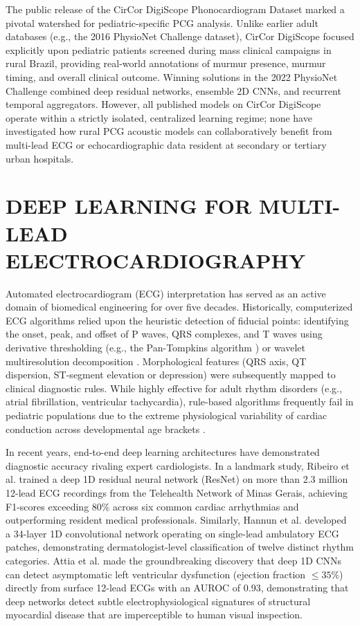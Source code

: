 \documentclass[12pt,a4paper]{amritareport}
\begin{document}
The public release of the CirCor DigiScope Phonocardiogram Dataset \cite{oliveira2022circor} marked a pivotal watershed for pediatric-specific PCG analysis. Unlike earlier adult databases (e.g., the 2016 PhysioNet Challenge dataset), CirCor DigiScope focused explicitly upon pediatric patients screened during mass clinical campaigns in rural Brazil, providing real-world annotations of murmur presence, murmur timing, and overall clinical outcome. Winning solutions in the 2022 PhysioNet Challenge \cite{reyna2022heart} combined deep residual networks, ensemble 2D CNNs, and recurrent temporal aggregators. However, all published models on CirCor DigiScope operate within a strictly isolated, centralized learning regime; none have investigated how rural PCG acoustic models can collaboratively benefit from multi-lead ECG or echocardiographic data resident at secondary or tertiary urban hospitals.


\section{DEEP LEARNING FOR MULTI-LEAD ELECTROCARDIOGRAPHY}

Automated electrocardiogram (ECG) interpretation has served as an active domain of biomedical engineering for over five decades. Historically, computerized ECG algorithms relied upon the heuristic detection of fiducial points: identifying the onset, peak, and offset of P waves, QRS complexes, and T waves using derivative thresholding (e.g., the Pan-Tompkins algorithm \cite{pan1985real}) or wavelet multiresolution decomposition \cite{martinez2004wavelet}. Morphological features (QRS axis, QT dispersion, ST-segment elevation or depression) were subsequently mapped to clinical diagnostic rules. While highly effective for adult rhythm disorders (e.g., atrial fibrillation, ventricular tachycardia), rule-based algorithms frequently fail in pediatric populations due to the extreme physiological variability of cardiac conduction across developmental age brackets \cite{dicapua2019pediatric}.

In recent years, end-to-end deep learning architectures have demonstrated diagnostic accuracy rivaling expert cardiologists. In a landmark study, Ribeiro et al. \cite{ribeiro2020automatic} trained a deep 1D residual neural network (ResNet) on more than 2.3 million 12-lead ECG recordings from the Telehealth Network of Minas Gerais, achieving F1-scores exceeding 80\% across six common cardiac arrhythmias and outperforming resident medical professionals. Similarly, Hannun et al. \cite{hannun2019cardiologist} developed a 34-layer 1D convolutional network operating on single-lead ambulatory ECG patches, demonstrating dermatologist-level classification of twelve distinct rhythm categories. Attia et al. \cite{attia2019screening} made the groundbreaking discovery that deep 1D CNNs can detect asymptomatic left ventricular dysfunction (ejection fraction $\leq 35\%$) directly from surface 12-lead ECGs with an AUROC of 0.93, demonstrating that deep networks detect subtle electrophysiological signatures of structural myocardial disease that are imperceptible to human visual inspection.
\end{document}
